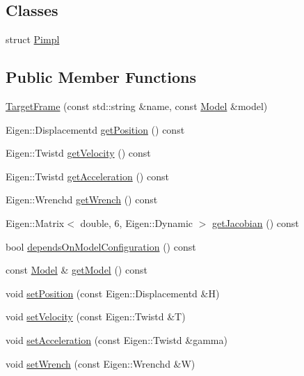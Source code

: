 \subsection*{Classes}
\begin{DoxyCompactItemize}
\item 
struct \hyperlink{structocra_1_1TargetFrame_1_1Pimpl}{Pimpl}
\end{DoxyCompactItemize}
\subsection*{Public Member Functions}
\begin{DoxyCompactItemize}
\item 
\hyperlink{classocra_1_1TargetFrame_ab7cf677c24a55434c4b285127235ae3c}{Target\+Frame} (const std\+::string \&name, const \hyperlink{classocra_1_1Model}{Model} \&model)
\item 
Eigen\+::\+Displacementd \hyperlink{classocra_1_1TargetFrame_ab2f3bd3f05be243a5d9e2123b943986d}{get\+Position} () const
\item 
Eigen\+::\+Twistd \hyperlink{classocra_1_1TargetFrame_a5eeda88210d7002c3c73ba949139ed5b}{get\+Velocity} () const
\item 
Eigen\+::\+Twistd \hyperlink{classocra_1_1TargetFrame_ab38d91f0d2f90b102259ec155a8a1245}{get\+Acceleration} () const
\item 
Eigen\+::\+Wrenchd \hyperlink{classocra_1_1TargetFrame_a5e9ccc5e2e5ae8e52a37b5810a76115d}{get\+Wrench} () const
\item 
Eigen\+::\+Matrix$<$ double, 6, Eigen\+::\+Dynamic $>$ \hyperlink{classocra_1_1TargetFrame_a94d2746633b7112afae754370a3a3e1f}{get\+Jacobian} () const
\item 
bool \hyperlink{classocra_1_1TargetFrame_ab4512f64463c359090ffdbead9a9e349}{depends\+On\+Model\+Configuration} () const
\item 
const \hyperlink{classocra_1_1Model}{Model} \& \hyperlink{classocra_1_1TargetFrame_acfd238567f0cfb9e6107cd17103ec6ea}{get\+Model} () const
\item 
void \hyperlink{classocra_1_1TargetFrame_a760081f3ae88a43ff91dc6a746083286}{set\+Position} (const Eigen\+::\+Displacementd \&H)
\item 
void \hyperlink{classocra_1_1TargetFrame_aff778ddb4526e90b927ec12bda52e8d6}{set\+Velocity} (const Eigen\+::\+Twistd \&T)
\item 
void \hyperlink{classocra_1_1TargetFrame_a3cbbcab6f3179320bd6c6f8c5aeabc75}{set\+Acceleration} (const Eigen\+::\+Twistd \&gamma)
\item 
void \hyperlink{classocra_1_1TargetFrame_a3d8e094de52e69b626322b6cce57d23e}{set\+Wrench} (const Eigen\+::\+Wrenchd \&W)
\end{DoxyCompactItemize}

